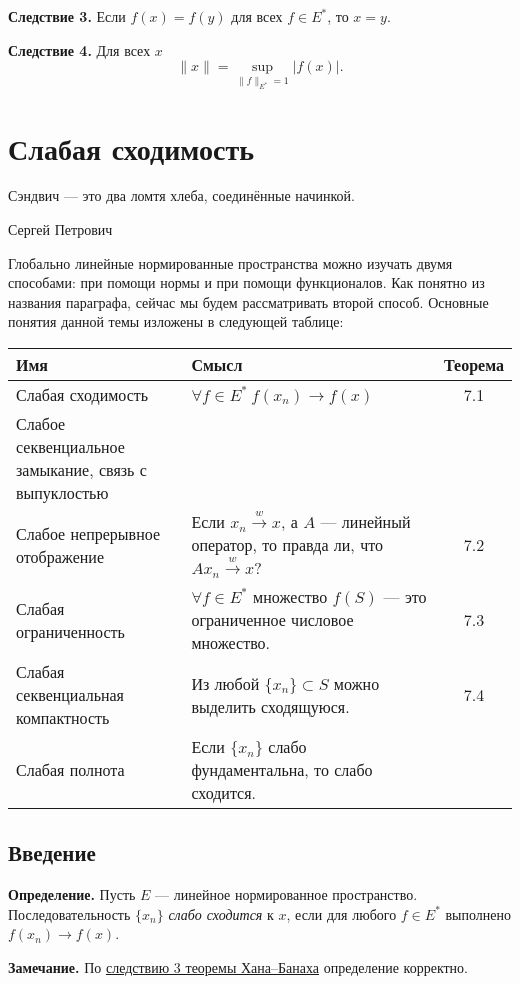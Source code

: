 \label{th:hahn-banach-coll-3} \textbf{Следствие 3.} Если $f(x) = f(y)$ для всех $f \in E^*$, то $x = y$.

\label{th:hahn-banach-coll-4} \textbf{Следствие 4.}
Для всех $x$
\[
    \|x\| = \sup_{\|f\|_{E^*} = 1} |f(x)|.
\]

\setcounter{section}{6}
\section{Слабая сходимость}
\epigraph{
    Сэндвич --- это два ломтя хлеба, соединённые начинкой.
}{Сергей Петрович}
Глобально линейные нормированные пространства можно изучать двумя способами: при помощи нормы и при помощи функционалов.
Как понятно из названия параграфа, сейчас мы будем рассматривать второй способ.
Основные понятия данной темы изложены в следующей таблице:

\begin{tabularx}{0.9\textwidth}{|X|X|c|}
    \hline
    Имя & Смысл & Теорема \\
    \hline
    Слабая сходимость & $\forall f \in E^*~ f(x_n) \to f(x)$ & 7.1 \\
    Слабое секвенциальное замыкание, связь с выпуклостью & &\\
    \hline
    Слабое непрерывное отображение & Если $x_n \xrightarrow{w} x$, а $A$ --- линейный оператор, то правда ли, что $Ax_n \xrightarrow{w} x$? & 7.2 \\
    \hline
    Слабая ограниченность & $\forall f \in E^*$ множество $f(S)$ --- это ограниченное числовое множество. & 7.3 \\
    \hline
    Слабая секвенциальная компактность & Из любой $\{x_n\} \subset S$ можно выделить сходящуюся. & 7.4 \\
    \hline
    Слабая полнота & Если $\{x_n\}$ слабо фундаментальна, то слабо сходится. & \\
    \hline
\end{tabularx}

\subsection{Введение}
\textbf{Определение.} Пусть $E$ --- линейное нормированное пространство.
Последовательность $\{x_n\}$ \textit{слабо сходится} к $x$, если для любого $f \in E^*$ выполнено $f(x_n) \to f(x)$.

\textbf{Замечание.} По \hyperref[th:hahn-banach-coll-3]{следствию 3 теоремы Хана--Банаха} определение корректно.

